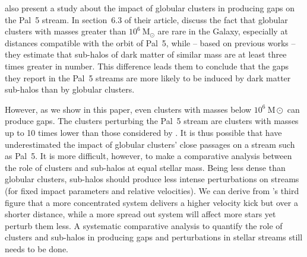 \documentclass{aa}
\begin{document}
  \citet{2017MNRAS.470...60E} also present a study about the impact of globular clusters in producing gaps on the Pal~5 stream. In section~6.3 of their article, \citet{2017MNRAS.470...60E} discuss the fact that globular clusters with masses greater than $10^6~\textrm{M}_\odot$ are rare in the Galaxy, especially at distances compatible with the orbit of Pal~5, while -- based on previous works -- they estimate that sub-halos of dark matter of similar mass are at least three times greater in number. This difference leads them to conclude that the gaps they report in the Pal~5 streams are more likely to be induced by dark matter sub-halos than by globular clusters. 
  
  However, as we show in this paper, even clusters with masses below $10^6~\textrm{M}\odot$ can produce gaps. The clusters perturbing the Pal~5 stream are clusters with masses up to 10 times lower than those considered by \citet{2017MNRAS.470...60E}. It is thus possible that \citet{2017MNRAS.470...60E} have underestimated the impact of globular clusters' close passages on a stream such as Pal~5. It is more difficult, however, to make a comparative analysis between the role of clusters and sub-halos at equal stellar mass. Being less dense than globular clusters, sub-halos should produce less intense perturbations on streams (for fixed impact parameters and relative velocities). We can derive from \citet{2016MNRAS.457.3817S}'s third figure that a more concentrated system delivers a higher velocity kick but over a shorter distance, while a more spread out system will affect more stars yet perturb them less. A systematic comparative analysis to quantify the role of clusters and sub-halos in producing gaps and perturbations in stellar streams still needs to be done.
\end{document}
